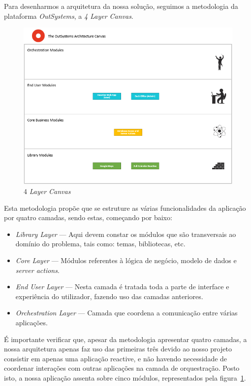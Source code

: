 Para desenharmos a arquitetura da nossa solução, seguimos a metodologia da plataforma \textit{OutSystems}, a \textit{4 Layer Canvas}.

\begin{figure}[H]
  \centering 
  \includegraphics[scale=0.7]{figures/4LayerCanvas.png}
  \caption{4 \textit{Layer Canvas}}\label{fig:4lc}
\end{figure}

Esta metodologia propõe que se estruture as várias funcionalidades da aplicação por quatro camadas, sendo estas, começando por baixo: 

\begin{itemize}
    \item \textit{Library Layer} --- Aqui devem constar os módulos que são transversais ao domínio do problema, tais como: temas, bibliotecas, etc. 
    \item \textit{Core Layer} --- Módulos referentes à lógica de negócio, modelo de dados e \textit{server actions}. 
    \item \textit{End User Layer} --- Nesta camada é tratada toda a parte de interface e experiência do utilizador, fazendo uso das camadas anteriores. 
    \item \textit{Orchestration Layer} --- Camada que coordena a comunicação entre várias aplicações. 
\end{itemize}

É importante verificar que, apesar da metodologia apresentar quatro camadas, 
a nossa arquitetura apenas faz uso das primeiras três devido ao nosso projeto consistir em apenas uma aplicação reactive, 
e não havendo necessidade de coordenar interações com outras aplicações na camada de orquestração. 
Posto isto, a nossa aplicação assenta sobre cinco módulos, representados pela figura~\ref{fig:4lc}.

